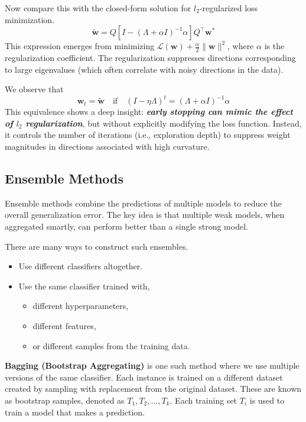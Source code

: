 \noindent Now compare this with the closed-form solution for $l_2$-regularized loss minimization.
\[
\tilde{\mathbf{w}} = Q \left[ I - (\Lambda + \alpha I)^{-1} \alpha \right] Q^\top \mathbf{w}^*
\]
This expression emerges from minimizing \( \mathcal{L}(\mathbf{w}) + \frac{\alpha}{2} \|\mathbf{w}\|^2 \), where \( \alpha \) is the regularization coefficient. The regularization suppresses directions corresponding to large eigenvalues (which often correlate with noisy directions in the data).

 We observe that
\[
\mathbf{w}_t = \tilde{\mathbf{w}} \quad \text{if} \quad (I - \eta \Lambda)^t = (\Lambda + \alpha I)^{-1} \alpha
\]
This equivalence shows a deep insight: \textit{\textbf{early stopping can mimic the effect of $l_2$ regularization}}, but without explicitly modifying the loss function. Instead, it controls the number of iterations (i.e., exploration depth) to suppress weight magnitudes in directions associated with high curvature.


\subsection{Ensemble Methods}

Ensemble methods combine the predictions of multiple models to reduce the overall generalization error. The key idea is that multiple weak models, when aggregated smartly, can perform better than a single strong model.

There are many ways to construct such ensembles.
\begin{itemize}
    \item Use different classifiers altogether.
    \item Use the same classifier trained with,
    \begin{itemize}
        \item different hyperparameters,
        \item different features,
        \item or different samples from the training data.
    \end{itemize}
\end{itemize}

\textbf{Bagging (Bootstrap Aggregating)} is one such method where we use multiple versions of the same classifier. Each instance is trained on a different dataset created by sampling with replacement from the original dataset. These are known as bootstrap samples, denoted as \( T_1, T_2, \ldots, T_k \). Each training set \( T_i \) is used to train a model that makes a prediction.

